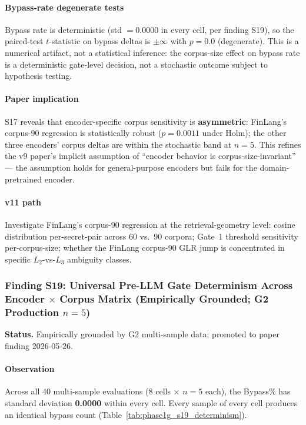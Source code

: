 \documentclass[journal]{IEEEtran}
\begin{document}
\paragraph{Bypass-rate degenerate tests}
Bypass rate is deterministic (std $= 0.0000$ in every cell, per finding S19), so the paired-test $t$-statistic on bypass deltas is $\pm\infty$ with $p{=}0.0$ (degenerate). This is a numerical artifact, not a statistical inference: the corpus-size effect on bypass rate is a deterministic gate-level decision, not a stochastic outcome subject to hypothesis testing.

\paragraph{Paper implication}
S17 reveals that encoder-specific corpus sensitivity is \textbf{asymmetric}: FinLang's corpus-90 regression is statistically robust ($p{=}0.0011$ under Holm); the other three encoders' corpus deltas are within the stochastic band at $n{=}5$. This refines the v9 paper's implicit assumption of ``encoder behavior is corpus-size-invariant'' --- the assumption holds for general-purpose encoders but fails for the domain-pretrained encoder.

\paragraph{v11 path}
Investigate FinLang's corpus-90 regression at the retrieval-geometry level: cosine distribution per-secret-pair across 60 vs.\ 90 corpora; Gate~1 threshold sensitivity per-corpus-size; whether the FinLang corpus-90 GLR jump is concentrated in specific $L_2$-vs-$L_3$ ambiguity classes.

\subsubsection{Finding S19: Universal Pre-LLM Gate Determinism Across Encoder $\times$ Corpus Matrix (Empirically Grounded; G2 Production $n{=}5$)}
\label{Sect:V_B_5_4_S19}

\textbf{Status.} Empirically grounded by G2 multi-sample data; promoted to paper finding 2026-05-26.

\paragraph{Observation}
Across all 40 multi-sample evaluations (8 cells $\times$ $n{=}5$ each), the Bypass\% has standard deviation \textbf{0.0000} within every cell. Every sample of every cell produces an identical bypass count (Table~\ref{tab:phase1g_s19_determinism}).
\end{document}
